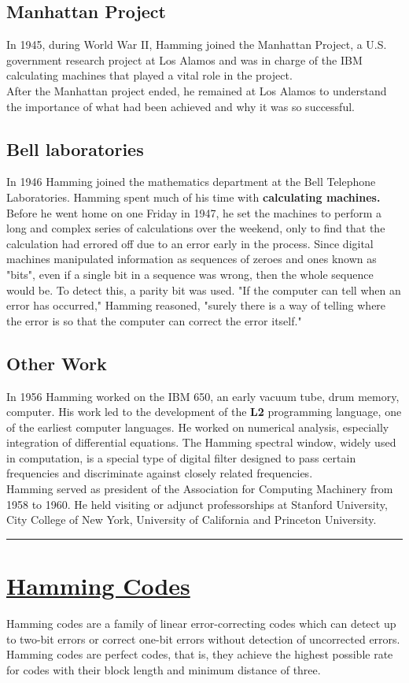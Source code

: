 \documentclass[a4paper,12pt]{article}
\begin{document}
\subsection{Manhattan Project}
In 1945, during World War II, Hamming  joined the Manhattan Project, a U.S. government research project at Los Alamos and was in charge of the IBM calculating machines that played a vital role in the project.\\
After the Manhattan project ended, he remained at Los Alamos to understand the importance of what had been achieved and why it was so successful. 
\subsection{Bell laboratories}
In 1946 Hamming joined the mathematics department at the Bell Telephone Laboratories. Hamming spent much of his time with \textbf{calculating machines.} Before he went home on one Friday in 1947, he set the machines to perform a long and complex series of calculations over the weekend, only to find  that the calculation had errored off due to an error early in the process. Since digital machines manipulated information as sequences of zeroes and ones known as  "bits", even if a single bit in a sequence was wrong, then the whole sequence would be. To detect this, a parity bit was used. "If the computer can tell when an error has occurred," Hamming reasoned, "surely there is a way of telling where the error is so that the computer can correct the error itself."
\subsection{Other Work}
In 1956 Hamming worked on the IBM 650, an early vacuum tube, drum memory, computer. His work led to the development of the \textbf{L2} programming language, one of the earliest computer languages. He worked on numerical analysis, especially integration of differential equations. The Hamming spectral window, widely used in computation, is a special type of digital filter designed to pass certain frequencies and discriminate against closely related frequencies.\\
Hamming served as president of the Association for Computing Machinery from 1958 to 1960. He held visiting or adjunct professorships at Stanford University, City College of New York, University of California and Princeton University.\\
\rule{\textwidth}{0.4pt}

\section{\underline{Hamming Codes}}
Hamming codes are a family of linear error-correcting codes which can detect up to two-bit errors or correct one-bit errors without detection of uncorrected errors. Hamming codes are perfect codes, that is, they achieve the highest possible rate for codes with their block length and minimum distance of three.
\end{document}
